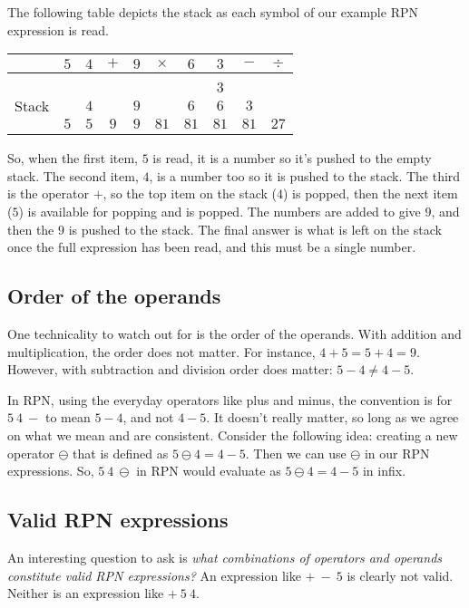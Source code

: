 \documentclass[a4paper]{iagproc}
\begin{document}
The following table depicts the stack as each symbol of our example RPN expression is read.
\begin{center}
  \begin{tabular}[b]{lccccccccc}
    \toprule
    & $5$ & $4$ & $+$ & $9$ & $\times$ & $6$  & $3$  & $-$  & $\div$ \\
    \midrule \\
    \multirow{3}{6mm}[-2mm]{\begin{sideways}Stack\end{sideways}}
    & $ $ & $ $ & $ $ & $ $ &     $ $  & $ $  & $3$  & $ $  & $ $    \\
    & $ $ & $4$ & $ $ & $9$ &     $ $  & $6$  & $6$  & $3$  & $ $    \\
    & $5$ & $5$ & $9$ & $9$ &     $81$ & $81$ & $81$ & $81$ & $27$    \\
    \bottomrule
  \end{tabular}
\end{center}
So, when the first item, $5$ is read, it is a number so it's pushed to the empty stack.
The second item, $4$, is a number too so it is pushed to the stack.
The third is the operator $+$, so the top item on the stack ($4$) is popped, then the next item ($5$) is available for popping and is popped.
The numbers are added to give $9$, and then the $9$ is pushed to the stack.
The final answer is what is left on the stack once the full expression has been read, and this must be a single number.

\subsection*{Order of the operands}
One technicality to watch out for is the order of the operands.
With addition and multiplication, the order does not matter.
For instance, $4+5=5+4=9$.
However, with subtraction and division order does matter: $5-4 \neq 4-5$.

In RPN, using the everyday operators like plus and minus, the convention is for $5 \ 4 \ -$ to mean $5-4$, and not $4-5$.
It doesn't really matter, so long as we agree on what we mean and are consistent.
Consider the following idea: creating a new operator $\ominus$ that is defined as $5 \ominus 4 = 4 - 5$.
Then we can use $\ominus$ in our RPN expressions.
So, $5 \ 4 \ \ominus$ in RPN would evaluate as $5 \ominus 4 = 4 - 5$ in infix.

\subsection*{Valid RPN expressions}
An interesting question to ask is \emph{what combinations of operators and operands constitute valid RPN expressions?}
An expression like $+ \ - \ 5$ is clearly not valid.
Neither is an expression like $+ \ 5 \ 4$.
\end{document}

